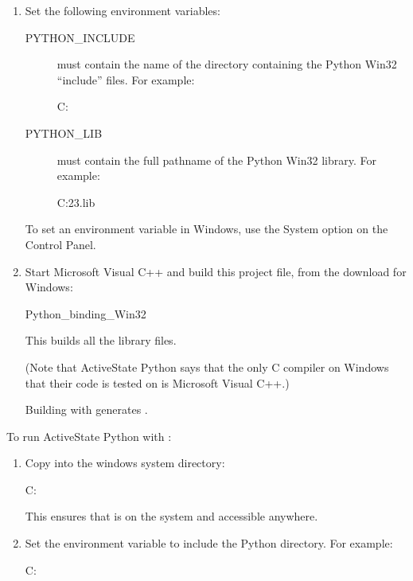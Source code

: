 \documentclass{sbmlmanual}
\begin{document}
\begin{enumerate}

\item
Set the following environment variables:

\begin{description}

\item[PYTHON\_INCLUDE] must contain the name of the directory containing the
Python Win32 ``include'' files. For example:

\begin{shellVerbatim}
C:
\end{shellVerbatim}

\item[PYTHON\_LIB] must contain the full pathname of the Python Win32 library.
For example:

\begin{shellVerbatim}
C:\libs\python23.lib
\end{shellVerbatim}

\end{description}

To set an environment variable in Windows, use the System option
on the Control Panel. 


\item
Start Microsoft Visual C++ and build this project file, from the \libsbml{}
download for Windows:

\begin{shellVerbatim}
Python_binding_Win32
\end{shellVerbatim}

This builds all the \libsbml{} library files.

(Note that ActiveState Python says that the only C compiler on Windows that
their code is tested on is Microsoft Visual C++.)

Building with  generates .
\end{enumerate}

To run ActiveState Python with \libsbml{}:

\begin{enumerate}

\item
Copy  into the windows system directory:

\begin{shellVerbatim}
C:\WINDOWS{}
\end{shellVerbatim}

This ensures that  is on the system  and
accessible anywhere.

\item
Set the environment variable  to include the \libsbml{}
Python directory.  For example:

\begin{shellVerbatim}
C:\libsbml\bindings\python
\end{shellVerbatim}

\end{enumerate}
\end{document}
